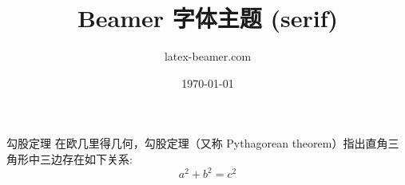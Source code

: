 \documentclass{ctexbeamer}
\title{Beamer 字体主题 (serif)}
\author{latex-beamer.com}
\date{\today}
\begin{document}
\begin{frame}
  \titlepage 
\end{frame}

\begin{frame}
   
\begin{block}{勾股定理}
在欧几里得几何，勾股定理（又称 Pythagorean theorem）指出直角三角形中三边存在如下关系:
\begin{equation}
  a^{2}+b^{2}=c^{2}
\end{equation}  
\end{block}   
 
\end{frame}
\end{document}

